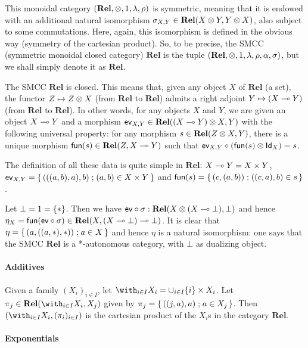 This monoidal category \((\mathbf{Rel},\otimes,1,\lambda,\rho)\) is
symmetric, meaning that it is endowed with an additional natural
isomorphism \(\sigma_{X,Y}\in\mathbf{Rel}(X\otimes Y,Y\otimes X)\), also
subject to some commutations. Here, again, this isomorphism is defined
in the obvious way (symmetry of the cartesian product). So, to be
precise, the SMCC (symmetric monoidal closed category) \(\mathbf{Rel}\)
is the tuple \((\mathbf{Rel},\otimes,1,\lambda,\rho,\alpha,\sigma)\),
but we shall simply denote it as \(\mathbf{Rel}\).

The SMCC \(\mathbf{Rel}\) is closed. This means that, given any object
\(X\) of \(\mathbf{Rel}\) (a set), the functor \(Z\mapsto Z\otimes X\)
(from \(\mathbf{Rel}\) to \(\mathbf{Rel}\)) admits a right adjoint
\(Y\mapsto (X\multimap Y)\) (from \(\mathbf{Rel}\) to \(\mathbf{Rel}\)). In
other words, for any objects \(X\) and \(Y\), we are given an object
\(X\multimap Y\) and a morphism
\(\mathsf{ev}_{X,Y}\in\mathbf{Rel}((X\multimap Y)\otimes X,Y)\) with the
following universal property: for any morphism
\(s\in\mathbf{Rel}(Z\otimes X,Y)\), there is a unique morphism
\(\mathsf{fun}(s)\in\mathbf{Rel}(Z,X\multimap Y)\) such that
\(\mathsf{ev}_{X,Y}\circ(\mathsf{fun}(s)\otimes\mathsf{Id}_X)=s\).

The definition of all these data is quite simple in \(\mathbf{Rel}\):
\(X\multimap Y=X\times Y\),
\(\mathsf{ev}_{X,Y}=\left\{\,{(((a,b),a),b)}\mathrel{;}{(a,b)\in X\times Y}\,\right\}\) and
\(\mathsf{fun}(s)=\left\{\,{(c,(a,b))}\mathrel{;}{((c,a),b)\in s}\,\right\}\).

Let \(\bot=1=\{*\}\). Then we have
\(\mathsf{ev}\circ\sigma:\mathbf{Rel}(X\otimes(X\multimap\bot),\bot)\) and
hence
\(\eta_X=\mathsf{fun}(\mathsf{ev}\circ\sigma)\in\mathbf{Rel}(X,(X\multimap\bot)\multimap\bot)\).
It is clear that \(\eta=\left\{\,{(a,((a,*),*))}\mathrel{;}{a\in X}\,\right\}\) and hence \(\eta\)
is a natural isomorphism: one says that the SMCC \(\mathbf{Rel}\) is a
*-autonomous category, with \(\bot\) as dualizing object.

\paragraph{Additives}\label{additives-2}

Given a family \((X_i)_{i\in I}\), let
\(\with_{i\in I}X_i=\cup_{i\in I}\{i\}\times X_i\). Let
\(\pi_j\in\mathbf{Rel}(\with_{i\in I}X_i,X_j)\) given by
\(\pi_j=\left\{\,{((j,a),a)}\mathrel{;}{a\in X_j}\,\right\}\). Then
\((\with_{i\in I}X_i,(\pi_i)_{i\in I})\) is the cartesian product of the
\(X_i\)s in the category \(\mathbf{Rel}\).

\paragraph{Exponentials}\label{exponentials-4}

